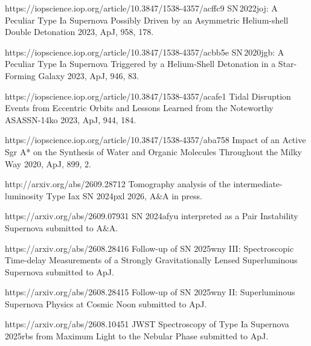 \begin{cvpubs}
\begin{cvpubitems}
{}
{https://iopscience.iop.org/article/10.3847/1538-4357/acffc9}
{SN\,2022joj: A Peculiar Type Ia Supernova Possibly Driven by an Asymmetric Helium-shell Double Detonation}
{2023, ApJ, 958, 178.}

{}
{https://iopscience.iop.org/article/10.3847/1538-4357/acbb5e}
{SN\,2020jgb: A Peculiar Type Ia Supernova Triggered by a Helium-Shell Detonation in a Star-Forming Galaxy}
{2023, ApJ, 946, 83.}

{}
{https://iopscience.iop.org/article/10.3847/1538-4357/acafe1}
{Tidal Disruption Events from Eccentric Orbits and Lessons Learned from the Noteworthy ASASSN-14ko}
{2023, ApJ, 944, 184.}

{}
{https://iopscience.iop.org/article/10.3847/1538-4357/aba758}
{Impact of an Active Sgr A* on the Synthesis of Water and Organic Molecules Throughout the Milky Way}
{2020, ApJ, 899, 2.}

\end{cvpubitems}


\cvpub
{ %
{}
}

\begin{cvpubitems}

{}
{http://arxiv.org/abs/2609.28712}
{Tomography analysis of the intermediate-luminosity Type Iax SN 2024pxl}
{2026, A\&A in press.}

{}
{https://arxiv.org/abs/2609.07931}
{SN 2024afyu interpreted as a Pair Instability Supernova}
{submitted to A\&A.}

{}
{https://arxiv.org/abs/2608.28416}
{Follow-up of SN 2025wny III: Spectroscopic Time-delay Measurements of a Strongly Gravitationally Lensed Superluminous Supernova}
{submitted to ApJ.}

{}
{https://arxiv.org/abs/2608.28415}
{Follow-up of SN 2025wny II: Superluminous Supernova Physics at Cosmic Noon}
{submitted to ApJ.}

{}
{https://arxiv.org/abs/2608.10451}
{JWST Spectroscopy of Type Ia Supernova 2025rbs from Maximum Light to the Nebular Phase}
{submitted to ApJ.}


\end{cvpubitems}
\end{cvpubs}
